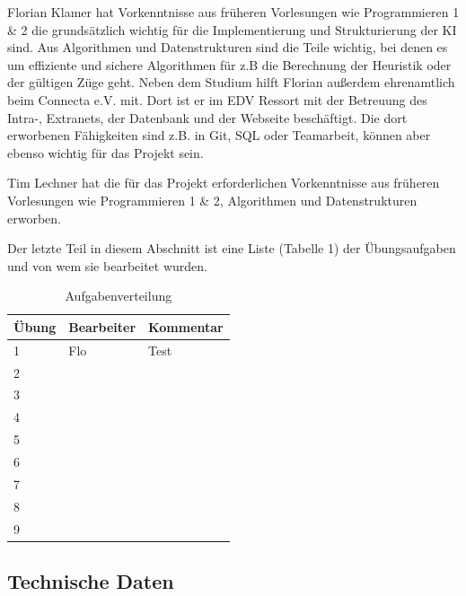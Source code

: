 \documentclass[12pt,a4paper,bibliography=totocnumbered,listof=totocnumbered]{scrartcl}
\begin{document}
Florian Klamer hat Vorkenntnisse aus früheren Vorlesungen wie Programmieren 1 \& 2 die grundsätzlich wichtig für die Implementierung und Strukturierung der KI sind. Aus Algorithmen und Datenstrukturen sind die Teile wichtig, bei denen es um effiziente und sichere Algorithmen für z.B die Berechnung der Heuristik oder der gültigen Züge geht. Neben dem Studium hilft Florian außerdem ehrenamtlich beim Connecta e.V. mit. Dort ist er im EDV Ressort mit der Betreuung des Intra-, Extranets, der Datenbank und der Webseite beschäftigt. Die dort erworbenen Fähigkeiten sind z.B. in Git, SQL oder Teamarbeit, können aber ebenso wichtig für das Projekt sein.

Tim Lechner hat die für das Projekt erforderlichen Vorkenntnisse aus früheren Vorlesungen wie Programmieren 1 \& 2, Algorithmen und Datenstrukturen erworben.

 Der letzte Teil in diesem Abschnitt ist eine Liste (Tabelle 1) der Übungsaufgaben und von wem sie bearbeitet wurden.

\begin{table}[]
	\centering
	\caption{Aufgabenverteilung}
	\label{my-label}
	\begin{tabular}{|l|l|l|}
		\hline
		Übung & Bearbeiter & Kommentar \\ \hline
		1               & Flo        & Test      \\ \hline
		2               &            &           \\ \hline
		3               &            &           \\ \hline
		4&            &           \\ \hline
		5&            &           \\ \hline
		6&            &           \\ \hline
				7&            &           \\ \hline
		8&            &           \\ \hline
		9&            &           \\ \hline
	\end{tabular}
\end{table}

\subsection{Technische Daten}
\end{document}
